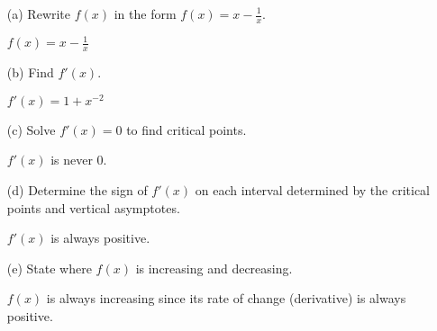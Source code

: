 \documentclass[12pt]{article}
\begin{document}
\begin{enumerate}
\item[(a)] Rewrite $f(x)$ in the form $f(x) = x - \frac{1}{x}$.
\\[8pt]
\begin{minipage}[t][1cm][t]{\linewidth}
    $\displaystyle f(x) = x - \frac{1}{x}$
\end{minipage}

\item[(b)] Find $f'(x)$.
\\[8pt]
\begin{minipage}[t][2cm][t]{\linewidth}
    $\displaystyle f'(x) = 1 + x^{-2}$
\end{minipage}

\item[(c)] Solve $f'(x) = 0$ to find critical points.
\\[8pt]
\begin{minipage}[t][2cm][t]{\linewidth}
    $\displaystyle f'(x)$ is never 0.
\end{minipage}

\item[(d)] Determine the sign of $f'(x)$ on each interval determined by the critical points and vertical asymptotes.
\\[8pt]
\begin{minipage}[t][2cm][t]{\linewidth}
    $\displaystyle f'(x)$ is always positive.
\end{minipage}

\item[(e)] State where $f(x)$ is increasing and decreasing.
\\[8pt]
\begin{minipage}[t][2cm][t]{\linewidth}
    $\displaystyle f(x)$ is always increasing since its rate of change (derivative) is always positive.
\end{minipage}
\end{enumerate}
\end{document}
